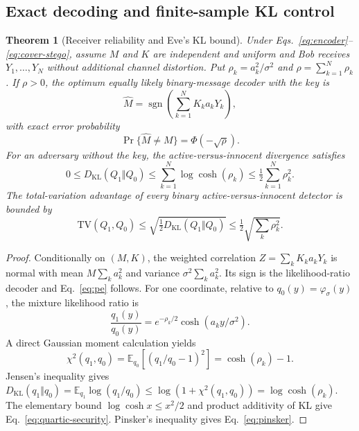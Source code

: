 \documentclass[preprint,12pt]{elsarticle}
\newtheorem{theorem}{Theorem}
\newcommand{\KL}{D_{\mathrm{KL}}}
\newcommand{\TV}{\mathrm{TV}}
\newcommand{\E}{\mathbb E}
\newcommand{\sgn}{\operatorname{sgn}}
\newcommand{\PhiN}{\Phi}
\begin{document}
\subsection{Exact decoding and finite-sample KL control}
\begin{theorem}[Receiver reliability and Eve's KL bound]
\label{thm:gaussian_security}
Under Eqs.~\eqref{eq:encoder}--\eqref{eq:cover-stego},
assume $M$ and $K$ are independent and uniform and Bob
receives $Y_1,\ldots,Y_N$ without additional channel
distortion. Put
$\rho_k=a_k^2/\sigma^2$ and
$\rho=\sum_{k=1}^N\rho_k$.
If $\rho>0$, the optimum equally likely binary-message
decoder with the key is
\begin{equation}
\widehat M=\sgn\left(\sum_{k=1}^N K_k a_kY_k\right),
\end{equation}
with exact error probability
\begin{equation}
\Pr\{\widehat M\ne M\}=\PhiN(-\sqrt\rho).
\label{eq:pe}
\end{equation}
For an adversary without the key, the active-versus-innocent
divergence satisfies
\begin{equation}
0\le \KL(Q_1\Vert Q_0)
\le\sum_{k=1}^N\log\cosh(\rho_k)
\le\tfrac12\sum_{k=1}^N\rho_k^2.
\label{eq:quartic-security}
\end{equation}
The total-variation advantage of every binary
active-versus-innocent detector is bounded by
\begin{equation}
\TV(Q_1,Q_0)
\le \sqrt{\tfrac12\KL(Q_1\Vert Q_0)}
\le \tfrac12\sqrt{\sum_k\rho_k^2}.
\label{eq:pinsker}
\end{equation}
\end{theorem}
\begin{proof}
Conditionally on $(M,K)$, the weighted correlation
$Z=\sum_k K_ka_kY_k$ is normal with mean
$M\sum_ka_k^2$ and variance
$\sigma^2\sum_ka_k^2$. Its sign is the
likelihood-ratio decoder and Eq.~\eqref{eq:pe} follows.
For one coordinate, relative to
$q_0(y)=\varphi_\sigma(y)$,
the mixture likelihood ratio is
\[
\frac{q_1(y)}{q_0(y)}
=e^{-\rho_k/2}
\cosh(a_ky/\sigma^2).
\]
A direct Gaussian moment calculation yields
\[
\chi^2(q_1,q_0)
=\E_{q_0}\!\left[
\left(q_1/q_0-1\right)^2\right]
=\cosh(\rho_k)-1.
\]
Jensen's inequality gives
$\KL(q_1\Vert q_0)
=\E_{q_1}\log(q_1/q_0)
\le\log(1+\chi^2(q_1,q_0))
=\log\cosh(\rho_k)$.
The elementary bound
$\log\cosh x\le x^2/2$ and product additivity
of KL give Eq.~\eqref{eq:quartic-security}.
Pinsker's inequality gives Eq.~\eqref{eq:pinsker}.
\end{proof}
\end{document}
